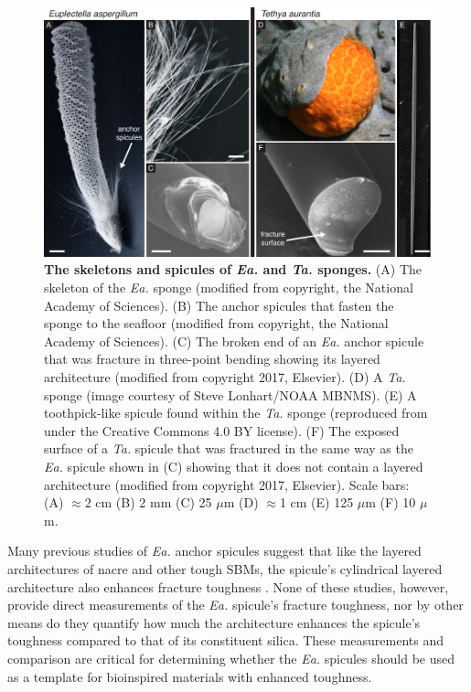 \documentclass[12pt,onecolumn]{article}
\makeatletter
\newcommand{\TA}{\textit{Ta.\@}\xspace}
\newcommand{\EA}{\textit{Ea.\@}\xspace}
\makeatother
\begin{document}
			\begin{figure}[ht!]
			\centering
			\includegraphics[width=\textwidth]{../Figures/FigureEATA/Figure2_V3.pdf}
			\caption{\textbf{The skeletons and spicules of \EA and \TA sponges.} (A) The skeleton of the \EA sponge (modified from \cite{monn2015new} copyright, the National Academy of Sciences). (B) The anchor spicules that fasten the sponge to the seafloor (modified from \cite{monn2015new} copyright, the National Academy of Sciences). (C) The broken end of an \EA anchor spicule that was fracture in three-point bending showing its layered architecture (modified from \cite{monn2017enhanced} copyright 2017, Elsevier). (D) A \TA sponge (image courtesy of Steve Lonhart/NOAA MBNMS). (E) A toothpick-like spicule found within the \TA sponge (reproduced from \cite{monn2017new} under the Creative Commons 4.0 BY license). (F) The exposed surface of a \TA spicule that was fractured in the same way as the \EA spicule shown in (C) showing that it does not contain a layered architecture (modified from \cite{monn2017enhanced} copyright 2017, Elsevier). Scale bars: (A) $\approx$2 cm (B) 2 mm  (C) 25 $\mu$m (D) $\approx$1 cm  (E) 125 $\mu$m  (F) 10 $\mu$m. }
			\label{fig:EATA}
			\end{figure}

Many previous studies of \EA anchor spicules suggest that like the layered architectures of nacre and other tough SBMs, the spicule's cylindrical layered architecture also enhances fracture toughness \cite{mayer2005rigid,mayer2011new,walter2007mechanisms,kolednik2011bioinspired}. None of these studies, however, provide direct measurements of the \EA spicule's fracture toughness, nor by other means do they quantify how much the architecture enhances the spicule's toughness compared to that of its constituent silica. These measurements and comparison are critical for determining whether the \EA spicules should be used as a template for bioinspired materials with enhanced toughness. 
\end{document}
